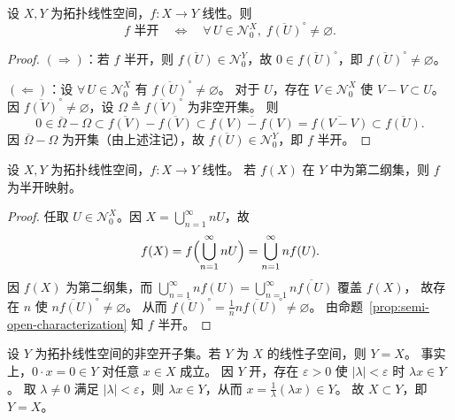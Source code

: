 \documentclass[lang=cn,a4paper,newtx,section]{elegantbook}
\begin{document}
\begin{proposition}\label{prop:semi-open-characterization}
  设 $X,Y$ 为拓扑线性空间，$f:X\to Y$ 线性。则
  \[
    f\text{ 半开}\quad\Longleftrightarrow\quad\forall\,U\in\mathcal{N}_0^X,\;\overline{f(U)}^\circ\ne\varnothing.
  \]
\end{proposition}

\begin{proof}
  $(\Rightarrow)$：若 $f$ 半开，则 $\overline{f(U)}\in\mathcal{N}_0^Y$，故 $0\in\overline{f(U)}^\circ$，即 $\overline{f(U)}^\circ\ne\varnothing$。

  $(\Leftarrow)$：设 $\forall\,U\in\mathcal{N}_0^X$ 有 $\overline{f(U)}^\circ\ne\varnothing$。
  对于 $U$，存在 $V\in\mathcal{N}_0^X$ 使 $V-V\subset U$。
  因 $\overline{f(V)}^\circ\ne\varnothing$，设 $\Omega\triangleq\overline{f(V)}^\circ$ 为非空开集。
  则
  \[
    0\in\overline{\Omega}-\Omega\subset\overline{f(V)}-\overline{f(V)}\subset\overline{f(V)-f(V)}=\overline{f(V-V)}\subset\overline{f(U)}.
  \]
  因 $\overline{\Omega}-\Omega$ 为开集（由上述注记），故 $\overline{f(U)}\in\mathcal{N}_0^Y$，即 $f$ 半开。
\end{proof}

\begin{lemma}\label{lem:second-category-semi-open}
  设 $X,Y$ 为拓扑线性空间，$f:X\to Y$ 线性。
  若 $f(X)$ 在 $Y$ 中为第二纲集，则 $f$ 为半开映射。
\end{lemma}

\begin{proof}
  任取 $U\in\mathcal{N}_0^X$。因 $X=\bigcup_{n=1}^{\infty}nU$，故
  \[
    f(X)=f\Bigl(\bigcup_{n=1}^{\infty}nU\Bigr)=\bigcup_{n=1}^{\infty}nf(U).
  \]
  因 $f(X)$ 为第二纲集，而 $\bigcup_{n=1}^{\infty}nf(U)=\bigcup_{n=1}^{\infty}\overline{nf(U)}$ 覆盖 $f(X)$，
  故存在 $n$ 使 $\overline{nf(U)}^\circ\ne\varnothing$。
  从而 $\overline{f(U)}^\circ=\frac{1}{n}\overline{nf(U)}^\circ\ne\varnothing$。
  由命题~\ref{prop:semi-open-characterization} 知 $f$ 半开。
\end{proof}

\begin{remark}
  设 $Y$ 为拓扑线性空间的非空开子集。若 $Y$ 为 $X$ 的线性子空间，则 $Y=X$。
  事实上，$0\cdot x=0\in Y$ 对任意 $x\in X$ 成立。
  因 $Y$ 开，存在 $\varepsilon>0$ 使 $|\lambda|<\varepsilon$ 时 $\lambda x\in Y$。
  取 $\lambda\ne 0$ 满足 $|\lambda|<\varepsilon$，则 $\lambda x\in Y$，从而 $x=\frac{1}{\lambda}(\lambda x)\in Y$。
  故 $X\subset Y$，即 $Y=X$。
\end{remark}
\end{document}
